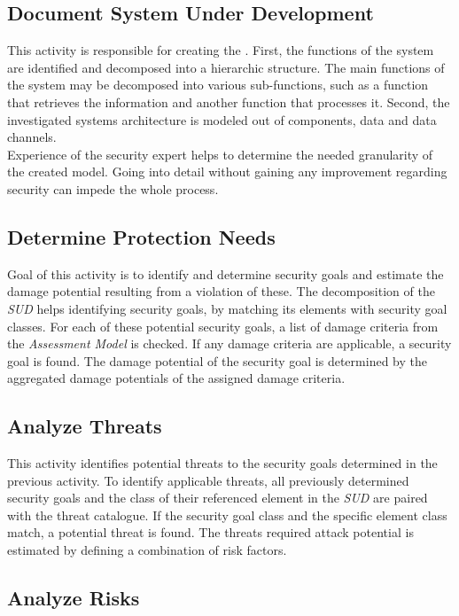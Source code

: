 \subsection{Document System Under Development}
\label{moradocsud}
This activity is responsible for creating the \textit{}. First, the functions of the system are identified and decomposed into a hierarchic structure. The main functions of the system may be decomposed into various sub-functions, such as a function that retrieves the information and another function that processes it. Second, the investigated systems architecture is modeled out of components, data and data channels.\\
Experience of the security expert helps to determine the needed granularity of the created model. Going into detail without gaining any improvement regarding security can impede the whole process.

\subsection{Determine Protection Needs}
\label{moraprotneeds}
Goal of this activity is to identify and determine security goals and estimate the damage potential resulting from a violation of these. The decomposition of the \textit{SUD} helps identifying security goals, by matching its elements with security goal classes. For each of these potential security goals, a list of damage criteria from the \textit{Assessment Model} is checked. If any damage criteria are applicable, a security goal is found. The damage potential of the security goal is determined by the aggregated damage potentials of the assigned damage criteria.

\subsection{Analyze Threats}
\label{moraanathreats}

This activity identifies potential threats to the security goals determined in the previous activity. To identify applicable threats, all previously determined security goals and the class of their referenced element in the \textit{SUD} are paired with the threat catalogue. If the security goal class and the specific element class match, a potential threat is found. The threats required attack potential is estimated by defining a combination of risk factors.

\subsection{Analyze Risks}
\label{moraanarisks}

